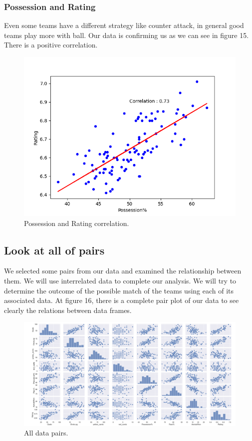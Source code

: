 \documentclass[conference]{IEEEtran}
\begin{document}
\subsubsection{Possession and Rating}
Even some teams have a different strategy like counter attack, in general good teams play more with ball. Our data is confirming us as we can see in figure 15. There is a positive correlation.

\begin{figure}[h]
  \includegraphics[width=\linewidth]{pos_rating_corr.png}
  \caption{Possession and Rating correlation.}
  \label{fig:pos_rating_corr}
\end{figure}


\subsection{Look at all of pairs}

We selected some pairs from our data and examined the relationship between them. We will use interrelated data to complete our analysis. We will try to determine the outcome of the possible match of the teams using each of its associated data. At figure 16, there is a complete pair plot of our data to see clearly the relations between data frames.

\begin{figure}[h]
  \includegraphics[width=\linewidth]{PairPlot.png}
  \caption{All data pairs.}
  \label{fig:pairplot}
\end{figure}
\end{document}
